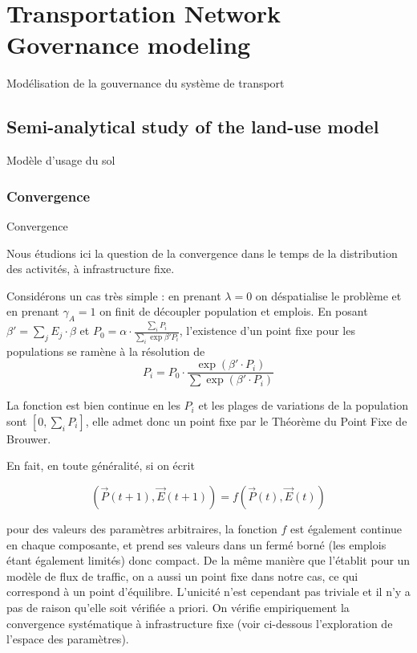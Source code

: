
\newpage

\section{Transportation Network Governance modeling}{Modélisation de la gouvernance du système de transport}

\label{app:sec:lutecia}


\subsection{Semi-analytical study of the land-use model}{Modèle d'usage du sol}


\subsubsection{Convergence}{Convergence}

Nous étudions ici la question de la convergence dans le temps de la distribution des activités, à infrastructure fixe.

Considérons un cas très simple : en prenant $\lambda = 0$ on déspatialise le problème et en prenant $\gamma_A = 1$ on finit de découpler population et emplois. En posant $\beta' = \sum_j E_j \cdot \beta$ et $P_0 = \alpha \cdot \frac{\sum_i P_i}{\sum_i \exp \beta' P_i}$, l'existence d'un point fixe pour les populations se ramène à la résolution de
\[
P_i = P_0 \cdot \frac{\exp\left(\beta' \cdot P_i\right)}{\sum \exp\left(\beta' \cdot P_i\right)}
\]

La fonction est bien continue en les $P_i$ et les plages de variations de la population sont $[0,\sum_i P_i]$, elle admet donc un point fixe par le Théorème du Point Fixe de Brouwer. 

En fait, en toute généralité, si on écrit

\[
(\vec{P}(t+1),\vec{E}(t+1)) = f(\vec{P}(t),\vec{E}(t))
\]

pour des valeurs des paramètres arbitraires, la fonction $f$ est également continue en chaque composante, et prend ses valeurs dans un fermé borné (les emplois étant également limités) donc compact. De la même manière que \cite{leurent2014user} l'établit pour un modèle de flux de traffic, on a aussi un point fixe dans notre cas, ce qui correspond à un point d'équilibre. L'unicité n'est cependant pas triviale et il n'y a pas de raison qu'elle soit vérifiée a priori. On vérifie empiriquement la convergence systématique à infrastructure fixe (voir ci-dessous l'exploration de l'espace des paramètres).


